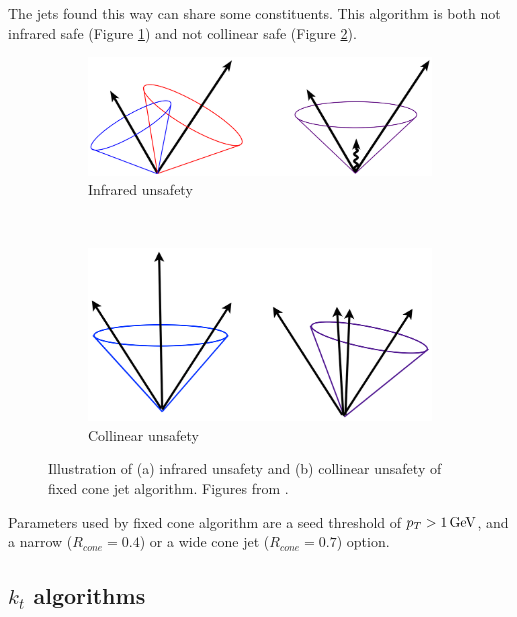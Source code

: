 The jets found this way can share some constituents. This algorithm is both not
infrared safe (Figure \ref{fig:IRsafety}) and not collinear safe (Figure
\ref{fig:ColSafety}).

\begin{figure}[t]
  \centering
  \begin{subfigure}[b]{0.65\textwidth}
    \includegraphics[width=\textwidth]{Chapter2/IRsafety.png}
    \caption{Infrared unsafety}
    \label{fig:IRsafety}
  \end{subfigure}
  ~
  \begin{subfigure}[b]{0.6\textwidth}
    \includegraphics[width=\textwidth]{Chapter2/ColSafety.png}
    \caption{Collinear unsafety}
    \label{fig:ColSafety}
  \end{subfigure}
  \caption{Illustration of (a) infrared unsafety and (b) collinear unsafety
    of fixed cone jet algorithm.
    Figures from \cite{JetTheoreticalPictures}.}
  \label{fig:JetIRCOLsafety}
\end{figure}

Parameters used by fixed cone algorithm are a seed threshold of $p_T > 1 \,\text{GeV}$,
and a narrow ($R_{cone} = 0.4$) or a wide cone jet ($R_{cone} = 0.7$) option.

\subsection{$k_t$ algorithms}

